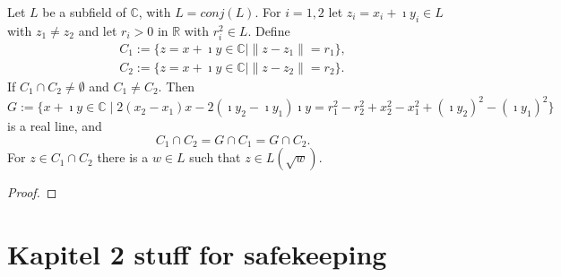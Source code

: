 \begin{lemma}
    \label{Intersection_circle_circle}
    Let $L$ be a subfield of $\mathbb{C}$, with $L = conj(L)$. For $i = 1,2 $ let $z_i = x_i + \imath y_i \in L$ with $z_1 \ne z_2$ and let $r_i > 0$ in $\mathbb{R}$ with $r_i^2 \in L$. Define
    \begin{equation*} \begin{aligned}
        C_1 := \{z = x + \imath y \in \mathbb{C} \mid \|z - z_1\| = r_1\},\\
        C_2 := \{z = x + \imath y \in \mathbb{C} \mid \|z - z_2\| = r_2\}.
    \end{aligned} \end{equation*}
    If $C_1 \cap C_2 \ne \emptyset$ and $C_1 \ne C_2$. Then 
    $$G := \{x+\imath y \in \mathbb{C} \mid 2(x_2 - x_1)x - 2(\imath y_2 - \imath y_1)\imath y = r_1^2 - r_2^2 + x_2^2 - x_1^2 + (\imath y_2)^2 - (\imath y_1)^2\} $$
    is a real line, and $$ C_1 \cap C_2 = G \cap C_1 = G \cap C_2. $$
    For $z \in C_1 \cap C_2$ there is a $w \in L$ such that $z \in L(\sqrt{w})$.
\end{lemma}
\begin{proof}
\end{proof}


\section{Kapitel 2 stuff for safekeeping}

